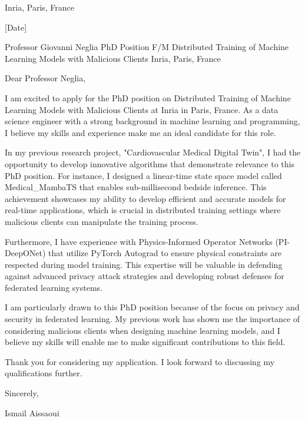 \documentclass[11pt]{letter}
\begin{document}
\address{\href{mailto:Giovanni.Neglia@inria.fr}{Giovanni Neglia}}{Inria, Paris, France}

[Date]

Professor Giovanni Neglia
PhD Position F/M Distributed Training of Machine Learning Models with Malicious Clients
Inria, Paris, France

Dear Professor Neglia,

I am excited to apply for the PhD position on Distributed Training of Machine Learning Models with Malicious Clients at Inria in Paris, France. As a data science engineer with a strong background in machine learning and programming, I believe my skills and experience make me an ideal candidate for this role.

In my previous research project, "Cardiovascular Medical Digital Twin", I had the opportunity to develop innovative algorithms that demonstrate relevance to this PhD position. For instance, I designed a linear-time state space model called Medical_MambaTS that enables sub-millisecond bedside inference. This achievement showcases my ability to develop efficient and accurate models for real-time applications, which is crucial in distributed training settings where malicious clients can manipulate the training process.

Furthermore, I have experience with Physics-Informed Operator Networks (PI-DeepONet) that utilize PyTorch Autograd to ensure physical constraints are respected during model training. This expertise will be valuable in defending against advanced privacy attack strategies and developing robust defenses for federated learning systems.

I am particularly drawn to this PhD position because of the focus on privacy and security in federated learning. My previous work has shown me the importance of considering malicious clients when designing machine learning models, and I believe my skills will enable me to make significant contributions to this field.

Thank you for considering my application. I look forward to discussing my qualifications further.

Sincerely,

Ismail Aissaoui
\end{document}

